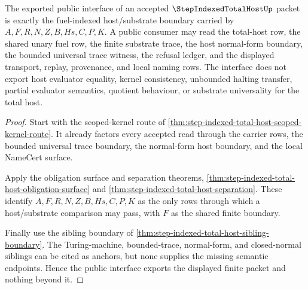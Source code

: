 \begin{theorem}
\label{thm:step-indexed-total-host-public-interface}
The exported public interface of an accepted $\StepIndexedTotalHostUp$ packet is exactly the fuel-indexed host/substrate boundary carried by $A,F,R,N,Z,B,Hs,C,P,K$. A public consumer may read the total-host row, the shared unary fuel row, the finite substrate trace, the host normal-form boundary, the bounded universal trace witness, the refusal ledger, and the displayed transport, replay, provenance, and local naming rows. The interface does not export host evaluator equality, kernel consistency, unbounded halting transfer, partial evaluator semantics, quotient behaviour, or substrate universality for the total host.
\end{theorem}
\begin{proof}
Start with the scoped-kernel route of \autoref{thm:step-indexed-total-host-scoped-kernel-route}. It already factors every accepted read through the carrier rows, the bounded universal trace boundary, the normal-form host boundary, and the local NameCert surface.

Apply the obligation surface and separation theorems, \autoref{thm:step-indexed-total-host-obligation-surface} and \autoref{thm:step-indexed-total-host-separation}. These identify $A,F,R,N,Z,B,Hs,C,P,K$ as the only rows through which a host/substrate comparison may pass, with $F$ as the shared finite boundary.

Finally use the sibling boundary of \autoref{thm:step-indexed-total-host-sibling-boundary}. The Turing-machine, bounded-trace, normal-form, and closed-normal siblings can be cited as anchors, but none supplies the missing semantic endpoints. Hence the public interface exports the displayed finite packet and nothing beyond it.
\end{proof}

